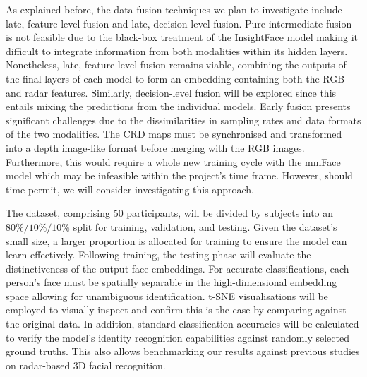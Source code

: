 \documentclass{mpaper}
\begin{document}
As explained before, the data fusion techniques we plan to investigate include late, feature-level fusion and late, decision-level fusion. Pure intermediate fusion is not feasible due to the black-box treatment of the InsightFace model making it difficult to integrate information from both modalities within its hidden layers. Nonetheless, late, feature-level fusion remains viable, combining the outputs of the final layers of each model to form an embedding containing both the RGB and radar features. Similarly, decision-level fusion will be explored since this entails mixing the predictions from the individual models. Early fusion presents significant challenges due to the dissimilarities in sampling rates and data formats of the two modalities. The CRD maps must be synchronised and transformed into a depth image-like format before merging with the RGB images. Furthermore, this would require a whole new training cycle with the mmFace model which may be infeasible within the project's time frame. However, should time permit, we will consider investigating this approach.


The dataset, comprising 50 participants, will be divided by subjects into an $80\%/10\%/10\%$ split for training, validation, and testing. Given the dataset's small size, a larger proportion is allocated for training to ensure the model can learn effectively. Following training, the testing phase will evaluate the distinctiveness of the output face embeddings. For accurate classifications, each person's face must be spatially separable in the high-dimensional embedding space allowing for unambiguous identification. t-SNE visualisations \cite{van2008visualizing} will be employed to visually inspect and confirm this is the case by comparing against the original data. In addition, standard classification accuracies will be calculated to verify the model's identity recognition capabilities against randomly selected ground truths. This also allows benchmarking our results against previous studies on radar-based 3D facial recognition.
\end{document}
